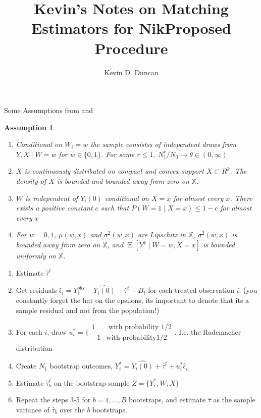 \documentclass{article}
\newtheorem{assumption}{Assumption}[section]
\DeclareMathOperator{\E}{E}
\newcommand{\hta}{\hat \tau^{t}}
\newcommand{\htb}{\hat \tau_{b}^{t}}
\newcommand{\he}{\hat{\epsilon}_{i}}
\newcommand{\Yi}{Y_{i}^{obs}}
\newcommand{\Yb}{Y_{i}^{*}}
\newcommand{\hYi}{\hat{Y_{i}(0)}}
\newcommand{\us}{u_{i}^{*}}
\begin{document}
\title{Kevin's Notes on Matching Estimators for Nik}
\author{Kevin D. Duncan}
\maketitle



Some Assumptions from \cite{OnR:16} and \cite{AnI:08}

\begin{assumption}\label{ATETasmp}

\begin{enumerate}
\item Conditional on $W_{i} = w$ the sample consistss of independent draws from $Y,X \mid W = w$ for $w \in \{0,1\}$. For some $r \leq 1,\ N_{1}^{r}/N_{0} \to \theta \in (0,\infty)$
\item $X$ is continuously distributed on compact and convex support $X \subset R^{k}$. The density of $X$ is bounded and bounded away from zero on $\mathbb{X}$.
\item $W$ is independent of $Y_{i}(0)$ conditional on $X = x$ for almost every $x$. There exists a positive constant $c$ such that $P(W = 1 \mid X= x) \leq 1-c$ for almost every $x$
\item For $w = 0,1$, $\mu(w,x)$ and $\sigma^{2}(w,x)$ are Lipschitz in $\mathbb{X}$, $\sigma^{2}(w,x)$ is bounded away from zero on $\mathbb{X}$, and $\E[Y^{4} \mid W=w, X=x]$ is bounded uniformly on $\mathbb{X}$.
\end{enumerate}

\end{assumption}

\begin{table}[h!]
\title{Proposed Procedure}
\begin{enumerate}
\item Estimate $\hta$
\item Get residuals $\he = \Yi-\hYi-\hta-B_{t}$ for each treated observation $i$. (you constantly forget the hat on the epsilons, its important to denote that its a sample residual and not from the population!)
\item For each $i$, draw $\us = \bigg\{ \begin{array}{cc} 1 & \text{ with probability } 1/2 \\ -1 & \text{with probability} 1/2 \end{array}$. I.e. the Rademacher distribution
\item Create $N_{1}$ bootstrap outcomes, $\Yb = \hYi +\hta + \us\he$
\item Estimate $\htb$ on the bootstrap sample $Z = \{\Yb, W, X\}$
\item Repeat the steps 3-5 for $b = 1,...,B$ bootstraps, and estimate $\hat \tau$ as the sample variance of $\hat \tau_{b}$ over the $b$ bootstraps.
\end{enumerate}
\label{boot}
\end{table}
\end{document}
